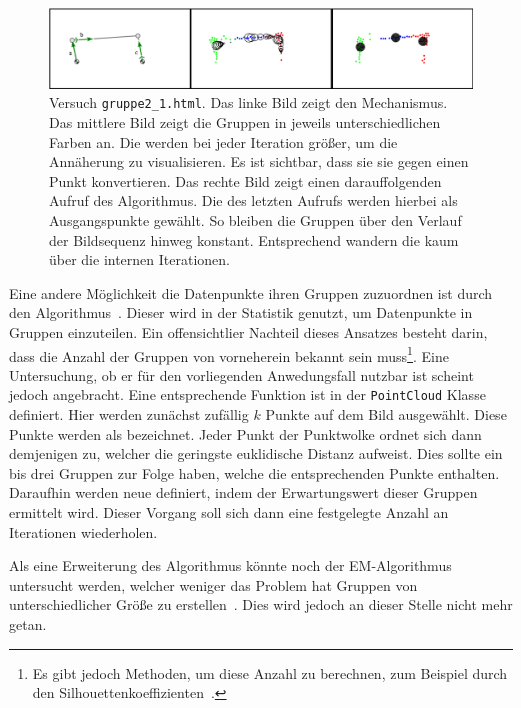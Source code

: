 \begin{figure}
    \centering
    \includegraphics[width=\textwidth]{gfx/k_means_centroids_edit.png}
    \caption[Versuch \lstinline{gruppe2_1.html}]{Versuch \lstinline{gruppe2_1.html}. Das linke Bild zeigt den Mechanismus. Das mittlere Bild zeigt die Gruppen in jeweils unterschiedlichen Farben an. Die  werden bei jeder Iteration grö{\ss}er, um die Annäherung zu visualisieren. Es ist sichtbar, dass sie sie gegen einen Punkt konvertieren. Das rechte Bild zeigt einen darauffolgenden Aufruf des Algorithmus. Die  des letzten Aufrufs werden hierbei als Ausgangspunkte gewählt. So bleiben die Gruppen über den Verlauf der Bildsequenz hinweg konstant. Entsprechend wandern die  kaum über die internen Iterationen.}
    \label{fig:gruppe2_1}
\end{figure}

Eine andere Möglichkeit die Datenpunkte ihren Gruppen zuzuordnen ist durch den  Algorithmus~\cite[S.~241]{Geron2019}.
Dieser wird in der Statistik genutzt, um Datenpunkte in Gruppen einzuteilen.
Ein offensichtlier Nachteil dieses Ansatzes besteht darin, dass die Anzahl der Gruppen von vorneherein bekannt sein muss\footnote{Es gibt jedoch Methoden, um diese Anzahl zu berechnen, zum Beispiel durch den Silhouettenkoeffizienten~\cite[S.~247]{Geron2019}.}.
Eine Untersuchung, ob er für den vorliegenden Anwedungsfall nutzbar ist scheint jedoch angebracht.
Eine entsprechende Funktion ist in der \lstinline{PointCloud} Klasse definiert.
Hier werden zunächst zufällig $k$ Punkte auf dem Bild ausgewählt.
Diese Punkte werden als  bezeichnet.
Jeder Punkt der Punktwolke ordnet sich dann demjenigen  zu, welcher die geringste euklidische Distanz aufweist.
Dies sollte ein bis drei Gruppen zur Folge haben, welche die entsprechenden Punkte enthalten.
Daraufhin werden neue  definiert, indem der Erwartungswert dieser Gruppen ermittelt wird.
Dieser Vorgang soll sich dann eine festgelegte Anzahl an Iterationen wiederholen.

Als eine Erweiterung des  Algorithmus könnte noch der EM-Algorithmus untersucht werden, welcher weniger das Problem hat Gruppen von unterschiedlicher Grö{\ss}e zu erstellen~\cite[S.~262]{Geron2019}.
Dies wird jedoch an dieser Stelle nicht mehr getan.

